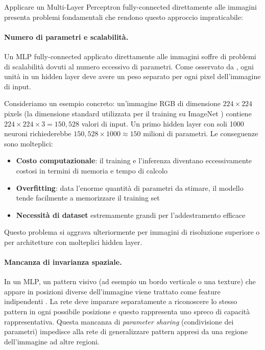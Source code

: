 Applicare un Multi-Layer Perceptron fully-connected direttamente alle immagini presenta problemi fondamentali che rendono questo approccio impraticabile:

\paragraph{Numero di parametri e scalabilità.} Un MLP fully-connected applicato direttamente alle immagini soffre di problemi di scalabilità dovuti al numero eccessivo di parametri. Come osservato da \cite{goodfellow2016deep}, ogni unità in un hidden layer deve avere un peso separato per ogni pixel dell'immagine di input. 

Consideriamo un esempio concreto: un'immagine RGB di dimensione $224 \times 224$ pixels (la dimensione standard utilizzata per il training su ImageNet \cite{russakovsky2015imagenet}) contiene $224 \times 224 \times 3 = 150,528$ valori di input. Un primo hidden layer con soli 1000 neuroni richiederebbe $150,528 \times 1000 \approx 150$ milioni di parametri. Le conseguenze sono molteplici:

\begin{itemize}
\item \textbf{Costo computazionale}: il training e l'inferenza diventano eccessivamente costosi in termini di memoria e tempo di calcolo
\item \textbf{Overfitting}: data l'enorme quantità di parametri da stimare, il modello tende facilmente a memorizzare il training set 
\item \textbf{Necessità di dataset} estremamente grandi per l'addestramento efficace
\end{itemize}

Questo problema si aggrava ulteriormente per immagini di risoluzione superiore o per architetture con molteplici hidden layer.

\paragraph{Mancanza di invarianza spaziale.} In un MLP, un pattern visivo (ad esempio un bordo verticale o una texture) che appare in posizioni diverse dell'im\-ma\-gi\-ne viene trattato come feature indipendenti \cite{goodfellow2016deep}. La rete deve imparare separatamente a riconoscere lo stesso pattern in ogni possibile posizione e questo rappresenta uno spreco di capacità rappresentativa. Questa mancanza di \textit{parameter sharing} (condivisione dei parametri) impedisce alla rete di generalizzare pattern appresi da una regione dell'immagine ad altre regioni. 

